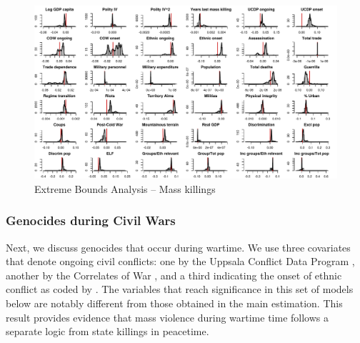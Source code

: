 \clearpage
\begin{figure}
    \centering
    \includegraphics[width=\textwidth]{images/mk.pdf}
    \caption{Extreme Bounds Analysis -- Mass killings}
    \label{fig:mk}
\end{figure}
\clearpage

\subsubsection{Genocides during Civil Wars}
\label{sec:civil-wars}

Next, we discuss genocides that occur during wartime. We use three covariates that denote ongoing civil conflicts: one by the Uppsala Conflict Data Program \citep{allansson2017organized,gleditsch2002armed}, another by the Correlates of War \citep{sarkees2010resort}, and a third indicating the onset of ethnic conflict as coded by \citet{cederman2010ethnic}. The variables that reach significance in this set of models below are notably different from those obtained in the main estimation. This result provides evidence that mass violence during wartime time follows a separate logic from state killings in peacetime.

\vspace{1cm}

